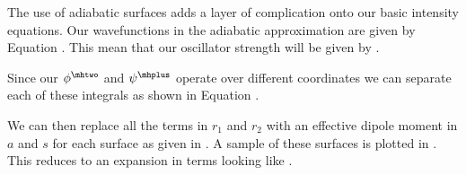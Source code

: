 %
%

The use of adiabatic surfaces adds a layer of complication onto our basic intensity equations. Our wavefunctions in the adiabatic approximation are given by Equation . This mean that our oscillator strength will be given by .


Since our $\phi^{\mhtwo}$ and $\psi^{\mhplus}$ operate over different coordinates we can separate each of these integrals as shown in Equation .


We can then replace all the terms in $r_1$ and $r_2$ with an effective dipole moment in $a$ and $s$ for each surface as given in . A sample of these surfaces is plotted in . This reduces  to an expansion in terms looking like .


%
